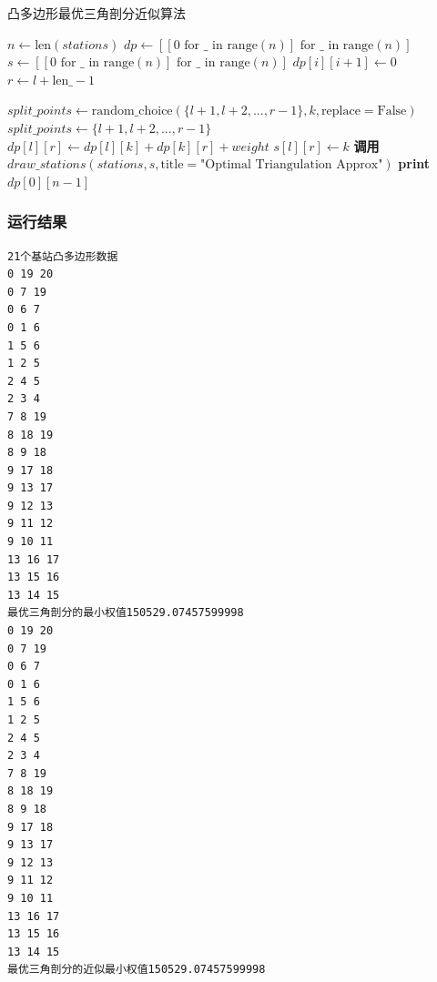 \documentclass[lang=cn,11pt,a4paper]{elegantpaper}
\begin{document}
\begin{algorithm}[H]
\caption{凸多边形最优三角剖分近似算法}
\begin{algorithmic}[1]
    \State $n \gets \text{len}(stations)$
    \State $dp \gets [[0 \text{ for } \_ \text{ in range}(n)] \text{ for } \_ \text{ in range}(n)]$ 
    \State $s \gets [[0 \text{ for } \_ \text{ in range}(n)] \text{ for } \_ \text{ in range}(n)]$ 
        \State $dp[i][i + 1] \gets 0$
    \EndFor
            \State $r \gets l + \text{len\_} - 1$
            
                \State $split\_points \gets \text{random\_choice}(\{l + 1, l + 2, ..., r - 1\}, k, \text{replace}=\text{False})$
            \Else {}
                \State $split\_points \gets \{l + 1, l + 2, ..., r - 1\}$
            \EndIf
                    \State $dp[l][r] \gets dp[l][k] + dp[k][r] + weight$
                    \State $s[l][r] \gets k$
                \EndIf
            \EndFor
        \EndFor
    \EndFor
    \State \textbf{调用} $draw\_stations(stations, s, \text{title}=\text{"Optimal Triangulation Approx"})$ 
    \State \textbf{print} $dp[0][n - 1]$
\EndProcedure
\end{algorithmic}
\end{algorithm}

\subsubsection{运行结果}
\begin{lstlisting}[language=text]
21个基站凸多边形数据
0 19 20
0 7 19
0 6 7
0 1 6
1 5 6
1 2 5
2 4 5
2 3 4
7 8 19
8 18 19
8 9 18
9 17 18
9 13 17
9 12 13
9 11 12
9 10 11
13 16 17
13 15 16
13 14 15
最优三角剖分的最小权值150529.07457599998
0 19 20
0 7 19
0 6 7
0 1 6
1 5 6
1 2 5
2 4 5
2 3 4
7 8 19
8 18 19
8 9 18
9 17 18
9 13 17
9 12 13
9 11 12
9 10 11
13 16 17
13 15 16
13 14 15
最优三角剖分的近似最小权值150529.07457599998
\end{lstlisting}
\end{document}
